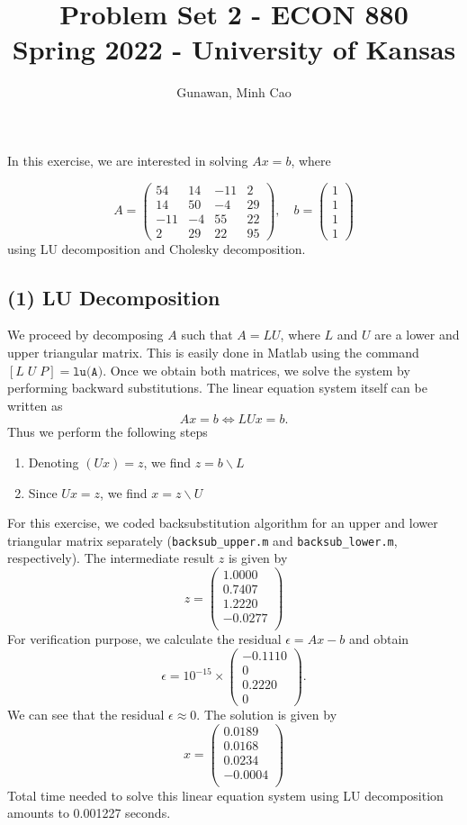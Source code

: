 \documentclass[11pt]{article}
\title{Problem Set 2 - ECON 880\\
	\small Spring 2022 - University of Kansas}
\author{Gunawan, Minh Cao}
\newcommand{\1}{\mathbbm{1}}
\begin{document}
\maketitle	

In this exercise, we are interested in solving $Ax=b$, where

\[A = \begin{pmatrix}
		54 &14& -11& 2 \\ 14 &50& -4& 29 \\ -11 &-4 &55& 22 \\ 2& 29& 22& 95
\end{pmatrix}, \quad b = \begin{pmatrix}
1\\1\\1\\1
\end{pmatrix} \]
using LU decomposition and Cholesky decomposition. 
\subsection*{(1) LU Decomposition}
We proceed by decomposing $A$ such that $A=LU$, where $L$ and $U$ are a lower and upper triangular matrix. This is easily done in Matlab using the command $[L \; U \; P] = \texttt{lu(A)}$. Once we obtain both matrices, we solve the system by performing backward substitutions. The linear equation system itself can be written as 
\[Ax=b \Leftrightarrow LUx =b.\]
Thus we perform the following steps
\begin{enumerate}
	\item Denoting $(Ux) =z$, we find $z = b\backslash L$
	\item Since $Ux = z$, we find $x=z\backslash U$
\end{enumerate} 
For this exercise, we coded backsubstitution algorithm for an upper and lower triangular matrix separately (\texttt{backsub\_upper.m} and \texttt{backsub\_lower.m}, respectively). The intermediate result $z$ is given by
\[
z = \begin{pmatrix}
	1.0000\\
	0.7407\\
	1.2220\\
	-0.0277\\
\end{pmatrix}
\]
For verification purpose, we calculate the residual $\epsilon = Ax-b$ and obtain
\[
\epsilon =   10^{-15} \times \begin{pmatrix}
   -0.1110\\
0\\
0.2220\\
0
\end{pmatrix}.
\]
We can see that the residual $\epsilon\approx0$. The solution is given by
\[x = \begin{pmatrix}
	    0.0189\\
	0.0168\\
	0.0234\\
	-0.0004\\
\end{pmatrix}\]
Total time needed to solve this linear equation system using LU decomposition amounts to 0.001227 seconds.
\end{document}
